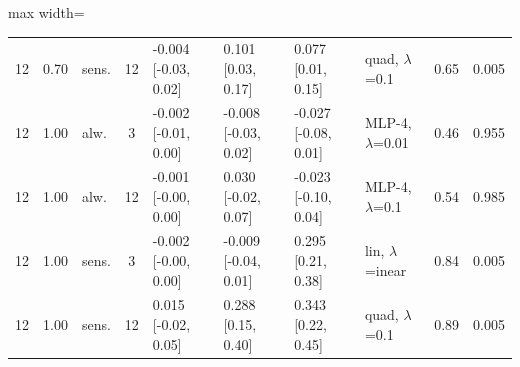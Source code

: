 \begin{table}[htbp]
\begin{adjustbox}{max width=\textwidth}
\begin{tabular}{cclc lll l cc}
12 & 0.70 & sens. & 12 & -0.004 [-0.03, 0.02] & 0.101 [0.03, 0.17] & 0.077 [0.01, 0.15] & quad, $\lambda$=0.1 & 0.65 & 0.005 \\
12 & 1.00 & alw. & 3 & -0.002 [-0.01, 0.00] & -0.008 [-0.03, 0.02] & -0.027 [-0.08, 0.01] & MLP-4, $\lambda$=0.01 & 0.46 & 0.955 \\
12 & 1.00 & alw. & 12 & -0.001 [-0.00, 0.00] & 0.030 [-0.02, 0.07] & -0.023 [-0.10, 0.04] & MLP-4, $\lambda$=0.1 & 0.54 & 0.985 \\
12 & 1.00 & sens. & 3 & -0.002 [-0.00, 0.00] & -0.009 [-0.04, 0.01] & 0.295 [0.21, 0.38] & lin, $\lambda$=inear & 0.84 & 0.005 \\
12 & 1.00 & sens. & 12 & 0.015 [-0.02, 0.05] & 0.288 [0.15, 0.40] & 0.343 [0.22, 0.45] & quad, $\lambda$=0.1 & 0.89 & 0.005 \\
\bottomrule
\end{tabular}
\end{adjustbox}
\end{table}